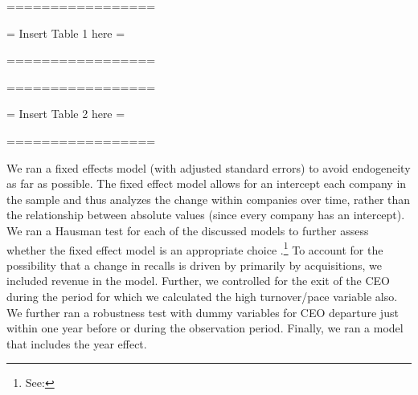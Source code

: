 \begin{center}
	
	=================
	
	= Insert Table 1 here =
	
	=================
	
	
	
	=================
	
	= Insert Table 2 here =
	
	=================
	
		
	
\end{center}

We ran a fixed effects model (with adjusted standard errors) to avoid endogeneity as far as possible. The fixed effect model allows for an intercept each company in the sample and thus analyzes the change within companies over time, rather than the relationship between absolute values (since every company has an intercept). We ran a Hausman test for each of the discussed models to further assess whether the fixed effect model is an appropriate choice \citep{Hausman1978}.\footnote{See: \log} To account for the possibility that a change in recalls is driven by primarily by acquisitions, we included revenue in the model. Further, we controlled for the exit of the CEO during the period for which we calculated the high turnover/pace variable also. We further ran a robustness test with dummy variables for CEO departure just within one year before or during the observation period. Finally, we ran a model that includes the year effect.





